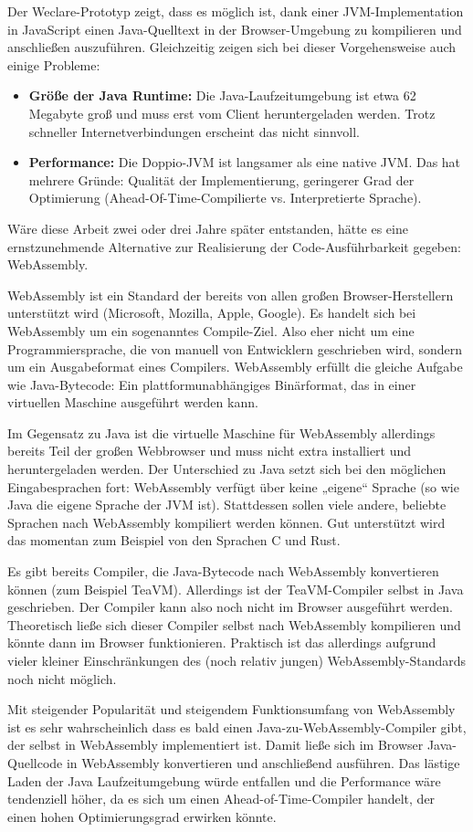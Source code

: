 Der Weclare-Prototyp zeigt, dass es möglich ist, dank einer JVM-Implementation in JavaScript einen Java-Quelltext in der Browser-Umgebung zu kompilieren und anschließen auszuführen. Gleichzeitig zeigen sich bei dieser Vorgehensweise auch einige Probleme:

\begin{itemize}
    \item \textbf{Größe der Java Runtime:} Die Java-Laufzeitumgebung ist etwa 62 Megabyte groß und muss erst vom Client heruntergeladen werden. Trotz schneller Internetverbindungen erscheint das nicht sinnvoll.
    \item \textbf{Performance:} Die Doppio-JVM ist langsamer als eine native JVM. Das hat mehrere Gründe: Qualität der Implementierung, geringerer Grad der Optimierung (Ahead-Of-Time-Compilierte vs. Interpretierte Sprache).
\end{itemize}

Wäre diese Arbeit zwei oder drei Jahre später entstanden, hätte es eine ernstzunehmende Alternative zur Realisierung der Code-Ausführbarkeit gegeben: WebAssembly.

WebAssembly ist ein Standard der bereits von allen großen Browser-Herstellern unterstützt wird (Microsoft, Mozilla, Apple, Google). Es handelt sich bei WebAssembly um ein sogenanntes Compile-Ziel. Also eher nicht um eine Programmiersprache, die von manuell von Entwicklern geschrieben wird, sondern um ein Ausgabeformat eines Compilers. WebAssembly erfüllt die gleiche Aufgabe wie Java-Bytecode: Ein plattformunabhängiges Binärformat, das in einer virtuellen Maschine ausgeführt werden kann.

Im Gegensatz zu Java ist die virtuelle Maschine für WebAssembly allerdings bereits Teil der großen Webbrowser und muss nicht extra installiert und heruntergeladen werden. Der Unterschied zu Java setzt sich bei den möglichen Eingabesprachen fort: WebAssembly verfügt über keine „eigene“ Sprache (so wie Java die eigene Sprache der JVM ist). Stattdessen sollen viele andere, beliebte Sprachen nach WebAssembly kompiliert werden können. Gut unterstützt wird das momentan zum Beispiel von den Sprachen C und Rust.

Es gibt bereits Compiler, die Java-Bytecode nach WebAssembly konvertieren können (zum Beispiel TeaVM). Allerdings ist der TeaVM-Compiler selbst in Java geschrieben. Der Compiler kann also noch nicht im Browser ausgeführt werden. Theoretisch ließe sich dieser Compiler selbst nach WebAssembly kompilieren und könnte dann im Browser funktionieren. Praktisch ist das allerdings aufgrund vieler kleiner Einschränkungen des (noch relativ jungen) WebAssembly-Standards noch nicht möglich.

Mit steigender Popularität und steigendem Funktionsumfang von WebAssembly ist es sehr wahrscheinlich dass es bald einen Java-zu-WebAssembly-Compiler gibt, der selbst in WebAssembly implementiert ist. Damit ließe sich im Browser Java-Quellcode in WebAssembly konvertieren und anschließend ausführen. Das lästige Laden der Java Laufzeitumgebung würde entfallen und die Performance wäre tendenziell höher, da es sich um einen Ahead-of-Time-Compiler handelt, der einen hohen Optimierungsgrad erwirken könnte.